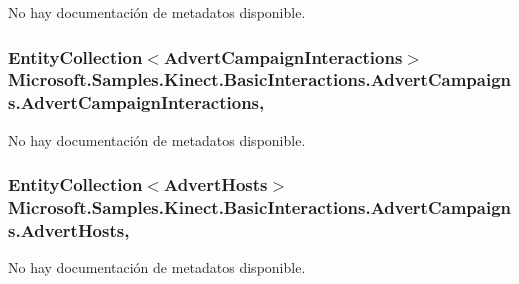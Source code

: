 No hay documentación de metadatos disponible. 

\hypertarget{class_microsoft_1_1_samples_1_1_kinect_1_1_basic_interactions_1_1_advert_campaigns_a16d52cf1c9d5c3f8e85a16adb8a19dfd}{
\subsubsection[{Advert\-Campaign\-Interactions}]{\setlength{\rightskip}{0pt plus 5cm}Entity\-Collection$<${\bf Advert\-Campaign\-Interactions}$>$ Microsoft.\-Samples.\-Kinect.\-Basic\-Interactions.\-Advert\-Campaigns.\-Advert\-Campaign\-Interactions\hspace{0.3cm}{\ttfamily [get]}, {\ttfamily [set]}}}\label{class_microsoft_1_1_samples_1_1_kinect_1_1_basic_interactions_1_1_advert_campaigns_a16d52cf1c9d5c3f8e85a16adb8a19dfd}


No hay documentación de metadatos disponible. 

\hypertarget{class_microsoft_1_1_samples_1_1_kinect_1_1_basic_interactions_1_1_advert_campaigns_af69cf733cf62c503cf7bf8c03c96a185}{
\subsubsection[{Advert\-Hosts}]{\setlength{\rightskip}{0pt plus 5cm}Entity\-Collection$<${\bf Advert\-Hosts}$>$ Microsoft.\-Samples.\-Kinect.\-Basic\-Interactions.\-Advert\-Campaigns.\-Advert\-Hosts\hspace{0.3cm}{\ttfamily [get]}, {\ttfamily [set]}}}\label{class_microsoft_1_1_samples_1_1_kinect_1_1_basic_interactions_1_1_advert_campaigns_af69cf733cf62c503cf7bf8c03c96a185}


No hay documentación de metadatos disponible. 

